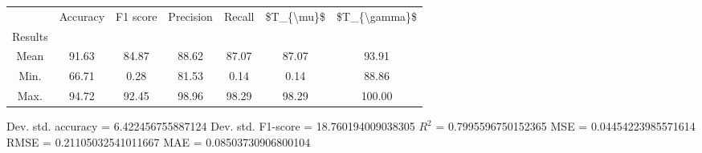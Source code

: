 \begin{tabular}{|c|c|c|c|c|c|c|}
\toprule
{} &  Accuracy &  F1 score &  Precision &  Recall &  \$T\_\{\textbackslash mu\}\$ &  \$T\_\{\textbackslash gamma\}\$ \\
Results &           &           &            &         &            &               \\
\hline
Mean    &     91.63 &     84.87 &      88.62 &   87.07 &      87.07 &         93.91 \\
Min.    &     66.71 &      0.28 &      81.53 &    0.14 &       0.14 &         88.86 \\
Max.    &     94.72 &     92.45 &      98.96 &   98.29 &      98.29 &        100.00 \\
\bottomrule
\end{tabular}

 Dev. std. accuracy = 6.422456755887124
 Dev. std. F1-score = 18.760194009038305
 $R^2$ = 0.7995596750152365
 MSE = 0.04454223985571614
 RMSE = 0.21105032541011667
 MAE = 0.08503730906800104